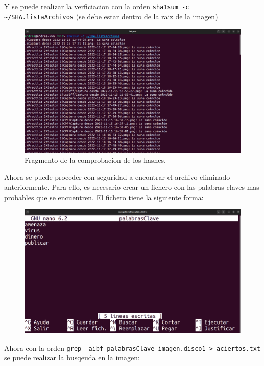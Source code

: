 \documentclass{article}
\begin{document}
Y se puede realizar la verficiacion con la orden \verb|sha1sum -c ~/SHA.listaArchivos| (se debe estar dentro de la raiz de la imagen)

\begin{figure}[H]
    \centering
    \includegraphics[width=\textwidth]{imagenes/Captura desde 2022-12-02 18-43-28.png}
    \caption{Fragmento de la comprobacion de los hashes.}
\end{figure}

Ahora se puede proceder con seguridad a encontrar el archivo eliminado anteriormente. Para ello, es necesario crear un fichero con las palabras claves mas probables que se encuentren. El fichero tiene la siguiente forma:

\begin{figure}[H]
    \centering
    \includegraphics[width=\textwidth]{imagenes/Captura desde 2022-12-02 18-52-07.png}
\end{figure}

Ahora con la orden \verb|grep -aibf palabrasClave imagen.disco1 > aciertos.txt| se puede realizar la busqeuda en la imagen:
\end{document}
